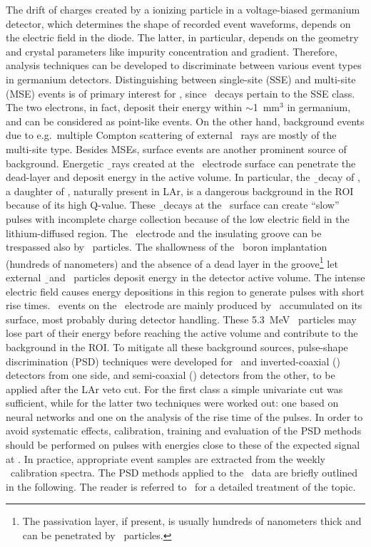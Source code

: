 The drift of charges created by a ionizing particle in a voltage-biased germanium
detector, which determines the shape of recorded event waveforms, depends on the electric
field in the diode. The latter, in particular, depends on the geometry and crystal
parameters like impurity concentration and gradient. Therefore, analysis
techniques can be developed to discriminate between various event types in germanium
detectors. Distinguishing between single-site (SSE) and multi-site (MSE) events is of
primary interest for \gerda, since \onbb\ decays pertain to the SSE class. The two
electrons, in fact, deposit their energy within $\sim$1~mm$^3$ in germanium, and can be
considered as point-like events. On the other hand, background events due to
e.g.~multiple Compton scattering of external \g\ rays are mostly of the multi-site type.
Besides MSEs, surface events are another prominent source of background. Energetic \b\
rays created at the \nplus\ electrode surface can penetrate the dead-layer and deposit
energy in the active volume. In particular, the \b\ decay of \kvz, a daughter of \Arh,
naturally present in LAr, is a dangerous background in the ROI because of its high
Q-value. These \b\ decays at the \nplus\ surface can create ``slow'' pulses with incomplete
charge collection because of the low electric field in the lithium-diffused region. The \pplus\
electrode and the insulating groove can be trespassed also by \a\ particles. The
shallowness of the \pplus\ boron implantation (hundreds of nanometers) and the
absence of a dead layer in the groove\footnote{%
  The passivation layer, if present, is usually hundreds of nanometers thick and can be
  penetrated by \a\ particles.
} let external \b{}nd \a\ particles deposit energy in the detector active volume. The intense
electric field causes energy depositions in this region to generate pulses with short rise
times. \a\ events on the \pplus\ electrode are mainly produced by \Po\ accumulated on its
surface, most probably during detector handling. These 5.3~MeV \a\ particles may lose part
of their energy before reaching the active volume and contribute to the background in the
ROI.
\newpar
To mitigate all these background sources, pulse-shape discrimination (PSD) techniques were
developed for \bege\ and inverted-coaxial (\icoax) detectors from one side, and
semi-coaxial (\scoax) detectors from the other, to be applied after the LAr veto cut. For
the first class a simple univariate cut was sufficient, while for the latter two
techniques were worked out: one based on neural networks and one on the analysis of the
rise time of the pulses.  In order to avoid systematic effects, calibration, training and
evaluation of the PSD methods should be performed on pulses with energies close to these
of the expected signal at \qbb.  In practice, appropriate event samples are extracted from
the weekly \Th\ calibration spectra.  The PSD methods applied to the \gerda\ data are
briefly outlined in the following. The reader is referred to~\cite{Agostini2021a} for a
detailed treatment of the topic.

